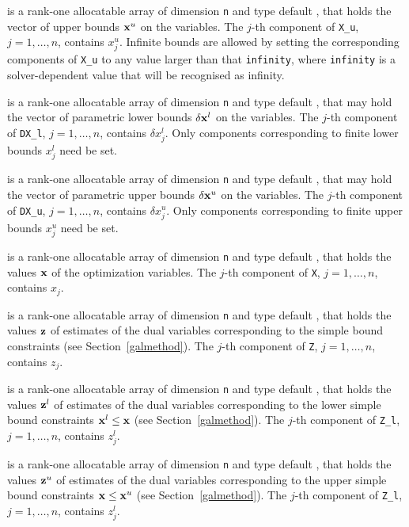 \documentclass{galahad}
\begin{document}
\begin{description}
 is a rank-one allocatable array of dimension {\tt n} and type
default \realdp, that holds
the vector of upper bounds ${\mathbf{x}}^{u}$ on the variables.
The $j$-th component of {\tt X\_u}, $j = 1, \ldots , n$,
contains $x_{j}^{u}$.
Infinite bounds are allowed by setting the corresponding
components of {\tt X\_u} to any value larger than that {\tt infinity},
where {\tt infinity} is a  solver-dependent value that will be recognised as
infinity.

 is a rank-one allocatable array of dimension {\tt n} and type
default \realdp, that may hold the vector of parametric lower bounds
$\delta {\mathbf{x}}^{l}$ on the variables. The $j$-th component of
{\tt DX\_l}, $j = 1, \ldots , n$, contains $\delta x_{j}^{l}$.
Only components corresponding to finite lower bounds $x_{j}^{l}$
need be set.

 is a rank-one allocatable array of dimension {\tt n} and type
default \realdp, that may hold the vector of parametric upper bounds
$\delta {\mathbf{x}}^{u}$  on the variables. The $j$-th component of
{\tt DX\_u}, $j = 1,  \ldots ,  n$, contains $\delta x_{j}^{u}$.
Only components corresponding to finite upper bounds $x_{j}^{u}$
need be set.

 is a rank-one allocatable array of dimension {\tt n} and type
default \realdp,
that holds the values ${\mathbf{x}}$ of the optimization variables.
The $j$-th component of {\tt X}, $j = 1,  \ldots , n$, contains $x_{j}$.

 is a rank-one allocatable array of dimension {\tt n} and type default
\realdp, that holds
the values ${\mathbf{z}}$ of estimates  of the dual variables
corresponding to the simple bound constraints (see Section~\ref{galmethod}).
The $j$-th component of {\tt Z}, $j = 1,  \ldots ,  n$, contains $z_{j}$.

 is a rank-one allocatable array of dimension {\tt n} and type default
\realdp, that holds
the values ${\mathbf{z}}^{l}$ of estimates  of the dual variables
corresponding to the lower simple bound constraints ${\mathbf{x}}^{l} \leq {\mathbf{x}}$
(see Section~\ref{galmethod}).
The $j$-th component of {\tt Z\_l}, $j = 1,  \ldots ,  n$,
contains $z_{j}^{l}$.

 is a rank-one allocatable array of dimension {\tt n} and type default
\realdp, that holds
the values ${\mathbf{z}}^{u}$ of estimates  of the dual variables
corresponding to the upper simple bound constraints ${\mathbf{x}} \leq {\mathbf{x}}^{u}$
(see Section~\ref{galmethod}).
The $j$-th component of {\tt Z\_l}, $j = 1,  \ldots ,  n$,
contains $z_{j}^{l}$.


\end{description}
\end{document}
